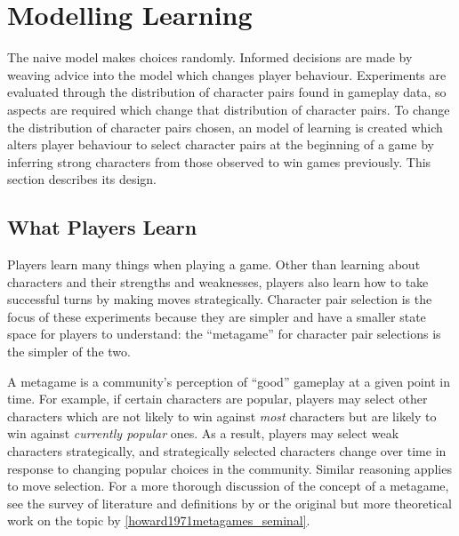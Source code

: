 




\section{Modelling Learning}
\label{learning_model_definition}

The naive model makes choices randomly. Informed decisions are made by weaving
advice into the model which changes player behaviour. Experiments are evaluated
through the distribution of character pairs found in gameplay data, so aspects
are required which change that distribution of character pairs. To change the
distribution of character pairs chosen, an \aspectoriented{} model of learning
is created which alters player behaviour to select character pairs at the
beginning of a game by inferring strong characters from those observed to win
games previously. This section describes its design.

\subsection{What Players Learn}

Players learn many things when playing a game. Other than learning about
characters and their strengths and weaknesses, players also learn how to take
successful turns by making moves strategically. Character pair selection is the
focus of these experiments because they are simpler and have a smaller state
space for players to understand: the ``metagame'' for character pair selections
is the simpler of the two.

\label{metagame_explanation}
A metagame is a community's perception of ``good'' gameplay at a given point in
time. For example, if certain characters are popular, players may select other
characters which are not likely to win against \emph{most} characters but are
likely to win against \emph{currently popular} ones. As a result, players may
select weak characters strategically, and strategically selected characters
change over time in response to changing popular choices in the community.
Similar reasoning applies to move selection. For a more thorough discussion of
the concept of a metagame, see the survey of literature and definitions by
\citet{metagaming_in_esports} or the original but more theoretical work on the
topic by \cref{howard1971metagames_seminal}.

